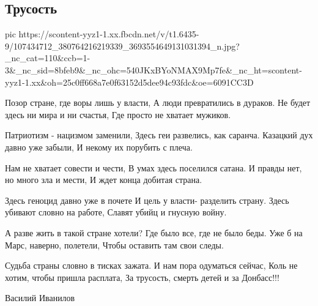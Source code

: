  
 
 
 
 

\subsection{Трусость}


\ifcmt
  pic https://scontent-yyz1-1.xx.fbcdn.net/v/t1.6435-9/107434712_380764216219339_3693554649131031394_n.jpg?_nc_cat=110&ccb=1-3&_nc_sid=8bfeb9&_nc_ohc=540JKxBYoNMAX9Mp7fe&_nc_ht=scontent-yyz1-1.xx&oh=25c0ff668a7e0f63152d5dee94c93fdc&oe=6091CC3D
\fi

Позор стране, где воры лишь у власти,
А люди превратились в дураков.
Не будет здесь ни мира и ни счастья,
Где просто не хватает мужиков.

Патриотизм - нацизмом заменили,
Здесь геи развелись, как саранча.
Казацкий дух давно уже забыли,
И некому их порубить с плеча.

Нам не хватает совести и чести,
В умах здесь поселился сатана.
И правды нет, но много зла и мести,
И ждет конца добитая страна.

Здесь геноцид давно уже в почете
И цель у власти- разделить страну.
Здесь убивают словно на работе,
Славят убийц и гнусную войну.

А разве жить в такой стране хотели?
Где было все, где не было беды.
Уже б на Марс, наверно, полетели,
Чтобы оставить там свои следы.

Судьба страны словно в тисках зажата.
И нам пора одуматься сейчас,
Коль не хотим, чтобы пришла расплата,
За трусость, смерть детей и за Донбасс!!!

Василий Иванилов

